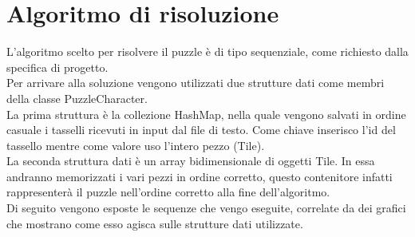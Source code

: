 % 
%
%

\section{Algoritmo di risoluzione}
L'algoritmo scelto per risolvere il puzzle è di tipo sequenziale, come richiesto dalla specifica di progetto. \\
Per arrivare alla soluzione vengono utilizzati due strutture dati come membri della classe PuzzleCharacter. \\
La prima struttura è la collezione HashMap, nella quale vengono salvati in ordine casuale i tasselli ricevuti in input dal file di testo. Come chiave inserisco l'id del tassello mentre come valore uso l'intero pezzo (Tile). \\
La seconda struttura dati è un array bidimensionale di oggetti Tile. In essa andranno memorizzati i vari pezzi in ordine corretto, questo contenitore infatti rappresenterà il puzzle nell'ordine corretto alla fine dell'algoritmo. \\
Di seguito vengono esposte le sequenze che vengo eseguite, correlate da dei grafici che mostrano come esso agisca sulle strutture dati utilizzate.

